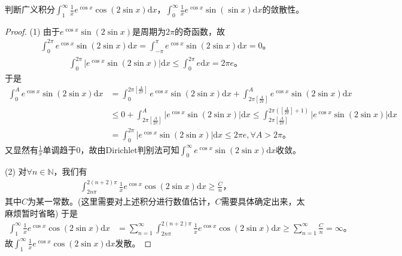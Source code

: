 \documentclass[../../main.tex]{subfiles}%
\begin{document}
\begin{example}
判断广义积分\(\int_{1}^{\infty}\frac{1}{x}e^{\cos x}\cos(2\sin x)\mathrm{d}x\)，\(\int_{0}^{\infty}\frac{1}{x}e^{\cos x}\sin(\sin x)\mathrm{d}x\)的敛散性。 
\end{example}
\begin{proof}

(1) 由于\(e^{\cos x}\sin \left( 2\sin x \right)\)是周期为\(2\pi\)的奇函数，故
\begin{align*}
\int_0^{2\pi}{e^{\cos x}\sin \left( 2\sin x \right) \mathrm{d}x}=\int_{-\pi}^{\pi}{e^{\cos x}\sin \left( 2\sin x \right) \mathrm{d}x}=0。
\end{align*}
\begin{align*}
\int_0^{2\pi}{\left| e^{\cos x}\sin \left( 2\sin x \right) \right|\mathrm{d}x}\leqslant \int_0^{2\pi}{e\mathrm{d}x}=2\pi e。
\end{align*}
于是
\begin{align*}
\int_0^A{e^{\cos x}\sin \left( 2\sin x \right) \mathrm{d}x}&=\int_0^{2\pi \left[ \frac{A}{2\pi} \right]}{e^{\cos x}\sin \left( 2\sin x \right) \mathrm{d}x}+\int_{2\pi \left[ \frac{A}{2\pi} \right]}^A{e^{\cos x}\sin \left( 2\sin x \right) \mathrm{d}x} \\
&\leqslant 0+\int_{2\pi \left[ \frac{A}{2\pi} \right]}^A{\left| e^{\cos x}\sin \left( 2\sin x \right) \right|\mathrm{d}x} 
\leqslant \int_{2\pi \left[ \frac{A}{2\pi} \right]}^{2\pi \left( \left[ \frac{A}{2\pi} \right] +1 \right)}{\left| e^{\cos x}\sin \left( 2\sin x \right) \right|\mathrm{d}x} \\
&=\int_0^{2\pi}{\left| e^{\cos x}\sin \left( 2\sin x \right) \right|\mathrm{d}x}\leqslant 2\pi e,\forall A>2\pi。
\end{align*}
又显然有\(\frac{1}{x}\)单调趋于\(0\)，故由Dirichlet判别法可知\(\int_0^{\infty}{e^{\cos x}\sin \left( 2\sin x \right) \mathrm{d}x}\)收敛。

(2) 对\(\forall n\in \mathbb{N}\)，我们有
\begin{align*}
\int_{2n\pi}^{2\left( n+2 \right) \pi}{\frac{1}{x}e^{\cos x}\cos \left( 2\sin x \right) \mathrm{d}x}\geqslant \frac{C}{n}，
\end{align*}
其中\(C\)为某一常数。(这里需要对上述积分进行数值估计，\(C\)需要具体确定出来，太麻烦暂时省略) 于是
\begin{align*}
\int_1^{\infty}{\frac{1}{x}e^{\cos x}\cos(2\sin x)\mathrm{d}x}&=\sum_{n=1}^{\infty}{\int_{2n\pi}^{2\left( n+2 \right) \pi}{\frac{1}{x}e^{\cos x}\cos \left( 2\sin x \right) \mathrm{d}x}} 
\geqslant \sum_{n=1}^{\infty}{\frac{C}{n}}=\infty。
\end{align*}
故\(\int_1^{\infty}{\frac{1}{x}e^{\cos x}\cos(2\sin x)\mathrm{d}x}\)发散。

\end{proof}
\end{document}

